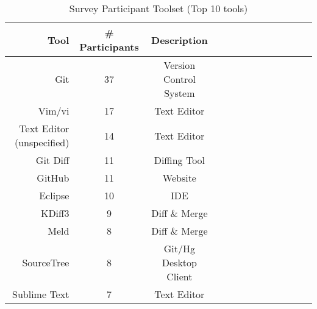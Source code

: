 \begin{table}[!]
\renewcommand{\arraystretch}{1.3}
\caption{Survey Participant Toolset (Top 10 tools)}
\label{survey_toolset}
\centering
\begin{tabularx}{0.45\textwidth}{@{}r|*{10}{C}c@{}c@{}}
\toprule
Tool & \# Participants & Description\\
\midrule
Git	& 37 & Version Control System\\
Vim/vi & 17 & Text Editor\\
Text Editor (unspecified) & 14 & Text Editor\\
Git Diff & 11 & Diffing Tool\\
GitHub & 11 & Website\\
Eclipse & 10 & IDE\\
KDiff3 & 9 & Diff \& Merge\\
Meld & 8 & Diff \& Merge\\
SourceTree & 8 & Git/Hg Desktop Client\\
Sublime Text & 7 & Text Editor\\
\bottomrule
\end{tabularx}
\end{table}